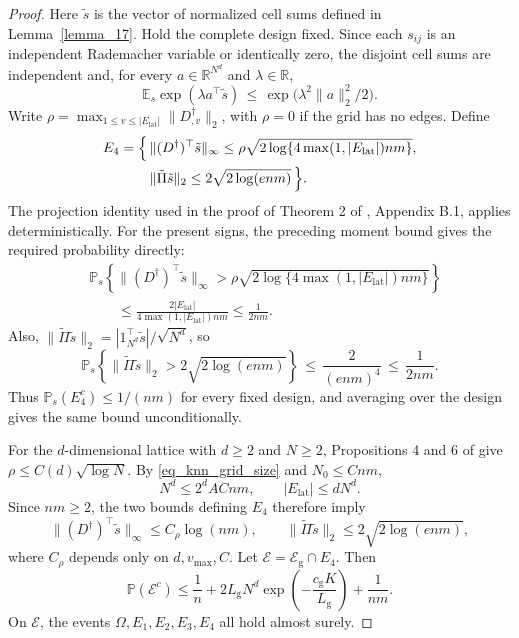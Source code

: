 \documentclass[twoside,11pt]{article}
\newenvironment{revision}{\color{revisionred}}{}
\begin{document}
\begin{proof}
\begin{revision}
Here $\tilde s$ is the vector of normalized cell sums defined in
Lemma~\ref{lemma_17}. Hold the complete design fixed. Since each
$s_{ij}$ is an independent Rademacher variable or identically zero,
the disjoint cell sums are independent and, for every
$a\in\mathbb R^{N^d}$ and $\lambda\in\mathbb R$,
\[
\mathbb E_s\exp(\lambda a^\top\tilde s)
\,\leq\,\exp\bigl(\lambda^2\|a\|_2^2/2\bigr).
\]
Write
$\rho=\max_{1\leq v\leq|E_{\mathrm{lat}}|}
                 \|D^\dag_{,v}\|_2$, with $\rho=0$ if the grid has no edges.
Define
\[
\begin{aligned}
E_4=\Bigl\{\,
&\|(D^\dag)^\top\tilde s\|_\infty
 \leq\rho\sqrt{2\log\{4\max(1,|E_{\mathrm{lat}}|)nm\}},\\
&\|\tilde\Pi\tilde s\|_2\leq2\sqrt{2\log(enm)}
\,\Bigr\}.
\end{aligned}
\]
The projection identity used in the proof of Theorem 2 of
\cite{hutter2016optimal}, Appendix B.1, applies deterministically.
For the present signs, the preceding moment bound gives the
required probability directly:
\[
\begin{aligned}
&\mathbb P_s\!\left\{
 \|(D^\dag)^\top\tilde s\|_\infty
 >\rho\sqrt{2\log\{4\max(1,|E_{\mathrm{lat}}|)nm\}}
 \right\}\\
&\qquad\leq
 \frac{2|E_{\mathrm{lat}}|}
      {4\max(1,|E_{\mathrm{lat}}|)nm}
 \leq\frac{1}{2nm}.
\end{aligned}
\]
Also,
$\|\tilde\Pi\tilde s\|_2
=|1_{N^d}^\top\tilde s|/\sqrt{N^d}$, so
\[
\mathbb P_s\!\left\{
 \|\tilde\Pi\tilde s\|_2>2\sqrt{2\log(enm)}
 \right\}
\,\leq\,\frac{2}{(enm)^4}
\,\leq\,\frac{1}{2nm}.
\]
Thus $\mathbb P_s(E_4^c)\leq1/(nm)$ for every fixed design, and
averaging over the design gives the same bound unconditionally.
\end{revision}

\begin{revision}
For the $d$-dimensional lattice with $d\geq2$ and $N\geq2$,
Propositions 4 and 6 of \cite{hutter2016optimal} give
$\rho\leq C(d)\sqrt{\log N}$.
By \eqref{eq_knn_grid_size} and $N_0\leq Cnm$,
\[
N^d\leq2^dACnm,
\qquad |E_{\mathrm{lat}}|\leq dN^d.
\]
Since $nm\geq2$, the two bounds defining $E_4$ therefore imply
\[
\|(D^\dag)^{\top}\tilde s\|_\infty\leq C_{\rho}\log(nm),
\qquad
\|\tilde\Pi\tilde s\|_2\leq2\sqrt{2\log(enm)},
\]
where $C_{\rho}$ depends only on $d,v_{\max},C$.
Let $\mathcal E=\mathcal E_{\mathrm g}\cap E_4$. Then
\begin{equation}
\label{eq_knn_width_failure}
\mathbb P(\mathcal E^c)
\leq\frac1n+2L_{\mathrm g}N^d
            \exp\left(-\frac{c_{\mathrm g}K}{L_{\mathrm g}}\right)
   +\frac1{nm}.
\end{equation}
On $\mathcal E$, the events $\Omega,E_1,E_2,E_3,E_4$ all hold
almost surely.
\end{revision}


\end{proof}
\end{document}
